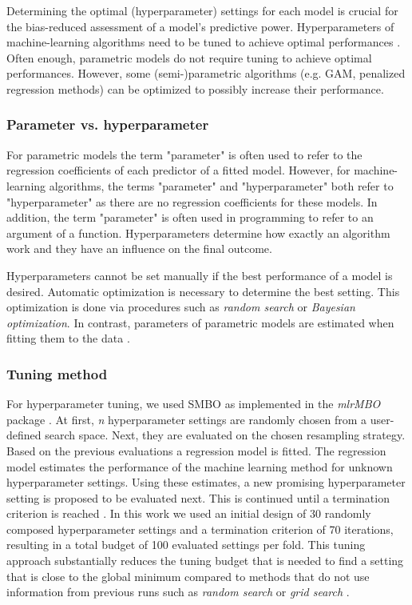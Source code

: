 \documentclass[review]{elsarticle}
\begin{document}
Determining the optimal (hyperparameter) settings for each model is crucial for the bias-reduced assessment of a model's predictive power.
Hyperparameters of machine-learning algorithms need to be tuned to achieve optimal performances \citep{Bergstra2012, Duarte2017, Hutter2011}.
Often enough, parametric models do not require tuning to achieve optimal performances.
However, some (semi-)parametric algorithms (e.g. \ac{GAM}, penalized regression methods) can be optimized to possibly increase their performance.

\subsubsection{Parameter vs. hyperparameter}
For parametric models the term "parameter" is often used to refer to the regression coefficients of each predictor of a fitted model.
However, for machine-learning algorithms, the terms "parameter" and "hyperparameter" both refer to "hyperparameter" as there are no regression coefficients for these models.
In addition, the term "parameter" is often used in programming to refer to an argument of a function.
Hyperparameters determine how exactly an algorithm work and they have an influence on the final outcome.

Hyperparameters cannot be set manually if the best performance of a model is desired.
Automatic optimization is necessary to determine the best setting.
This optimization is done via procedures such as \textit{random search} or \textit{Bayesian optimization}.
In contrast, parameters of parametric models are estimated when fitting them to the data \citep{Kuhn2013}.

\subsubsection{Tuning method}
For hyperparameter tuning, we used \ac{SMBO} as implemented in the \textit{mlrMBO} package \citep{mlrMBO}.
At first, \textit{n} hyperparameter settings are randomly chosen from a user-defined search space.
Next, they are evaluated on the chosen resampling strategy.
Based on the previous evaluations a regression model is fitted.
The regression model estimates the performance of the machine learning method for unknown hyperparameter settings.
Using these estimates, a new promising hyperparameter setting is proposed to be evaluated next.
This is continued until a termination criterion is reached \citep{Hutter2011, Jones1998}.
In this work we used an initial design of 30 randomly composed hyperparameter settings and a termination criterion of 70 iterations, resulting in a total budget of 100 evaluated settings per fold.
This tuning approach substantially reduces the tuning budget that is needed to find a setting that is close to the global minimum compared to methods that do not use information from previous runs such as \textit{random search} or \textit{grid search} \citep{Bergstra2012}.
\end{document}

